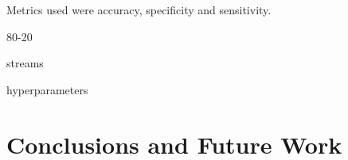 \documentclass{article}
\begin{document}

Metrics used were accuracy, specificity and sensitivity.

80-20

streams

hyperparameters



\section{Conclusions and Future Work}
\label{sec:conclusion}



\end{document}
